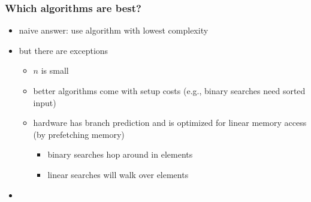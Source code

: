 \begin{frame}
 \frametitle{Which algorithms are best?}
 \begin{itemize}
  \item naive answer: use algorithm with lowest complexity
  \item but there are exceptions
  \begin{itemize}
   \item \(n\) is small
   \item better algorithms come with setup costs (e.g., binary searches need sorted input)
   \item hardware has branch prediction and is optimized for linear memory access (by prefetching memory)
   \begin{itemize}
    \item binary searches hop around in elements
    \item linear searches will walk over elements
   \end{itemize}
  \end{itemize}
  \item {}
 \end{itemize}
\end{frame}
